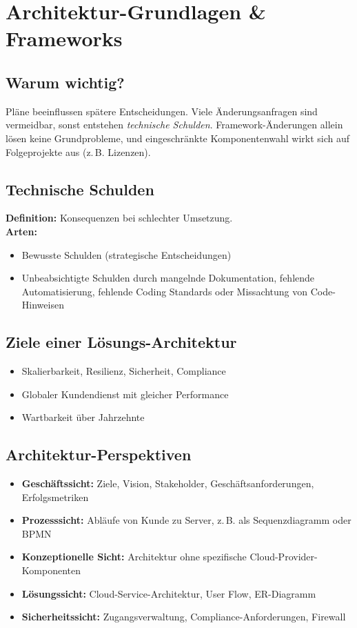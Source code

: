 \section{Architektur-Grundlagen \& Frameworks}

\subsection{Warum wichtig?}
Pläne beeinflussen spätere Entscheidungen. Viele Änderungsanfragen
sind vermeidbar, sonst entstehen \emph{technische Schulden}. Framework-Änderungen
allein lösen keine Grundprobleme, und eingeschränkte Komponentenwahl
wirkt sich auf Folgeprojekte aus (z.\,B. Lizenzen).

\subsection{Technische Schulden}
\textbf{Definition:} Konsequenzen bei schlechter Umsetzung.\\[4pt]
\textbf{Arten:}
\begin{itemize}
    \item Bewusste Schulden (strategische Entscheidungen)
    \item Unbeabsichtigte Schulden durch mangelnde Dokumentation,
          fehlende Automatisierung, fehlende Coding Standards
          oder Missachtung von Code-Hinweisen
\end{itemize}

\subsection{Ziele einer Lösungs-Architektur}
\begin{itemize}
    \item Skalierbarkeit, Resilienz, Sicherheit, Compliance
    \item Globaler Kundendienst mit gleicher Performance
    \item Wartbarkeit über Jahrzehnte
\end{itemize}

\subsection{Architektur-Perspektiven}
\begin{itemize}
    \item \textbf{Geschäftssicht:} Ziele, Vision, Stakeholder,
          Geschäftsanforderungen, Erfolgsmetriken
    \item \textbf{Prozesssicht:} Abläufe von Kunde zu Server,
          z.\,B. als Sequenzdiagramm oder BPMN
    \item \textbf{Konzeptionelle Sicht:} Architektur ohne
          spezifische Cloud-Provider-Komponenten
    \item \textbf{Lösungssicht:} Cloud-Service-Architektur,
          User Flow, ER-Diagramm
    \item \textbf{Sicherheitssicht:} Zugangsverwaltung,
          Compliance-Anforderungen, Firewall
\end{itemize}


